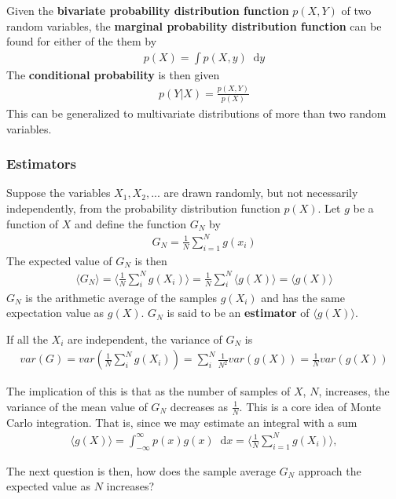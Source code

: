 \documentclass[twoside,english]{uiofysmaster}
\newcommand*\dif{\mathop{}\!\mathrm{d}}
\begin{document}
Given the \textbf{bivariate probability distribution function} $p(X,Y)$ of two random variables, the \textbf{marginal probability distribution function} can be found for either of the them by 
\begin{align}
	p(X) = \int p(X,y) \dif y
\end{align}
The \textbf{conditional probability} is then given
\begin{align}
	p(Y|X) = \frac{p(X,Y)}{p(X)}
\end{align}
This can be generalized to multivariate distributions of more than two random variables.


\subsubsection{Estimators}
Suppose the variables $X_1, X_2,...$ are drawn randomly, but not necessarily independently, from the probability distribution function $p(X)$. Let $g$ be a function of $X$ and define the function $G_N$ by
\begin{align}
	G_N = \frac{1}{N} \sum_{i=1}^N g(x_i)
\end{align}
The expected value of $G_N$ is then
\begin{align}
	\langle G_N \rangle = \langle \frac{1}{N} \sum_i^N g(X_i) \rangle = \frac{1}{N} \sum_i^N \langle g(X) \rangle = \langle g(X) \rangle
\end{align} 
$G_N$ is the arithmetic average of the samples $g(X_i)$ and has the same expectation value as $g(X)$. $G_N$ is said to be an \textbf{estimator} of $\langle g(X) \rangle$. 

If all the $X_i$ are independent, the variance of $G_N$ is
\begin{align}
	var(G) = var( \frac{1}{N} \sum_i^N g(X_i)  ) = \sum_i^N \frac{1}{N^2} var(g(X)) 
	= \frac{1}{N} var(g(X))
\end{align}

The implication of this is that as the number of samples of $X$, $N$, increases, the variance of the mean value of $G_N$ decreases as $\frac{1}{N}$. This is a core idea of Monte Carlo integration. That is, since we may estimate an integral with a sum
\begin{align}
	\langle g(X) \rangle = \int_{-\infty}^\infty p(x) g(x) \dif x = \langle \frac{1}{N} \sum_{i=1}^N g(X_i) \rangle,
\end{align}

The next question is then, how does the sample average $G_N$ approach the expected value as $N$ increases?
\end{document}
